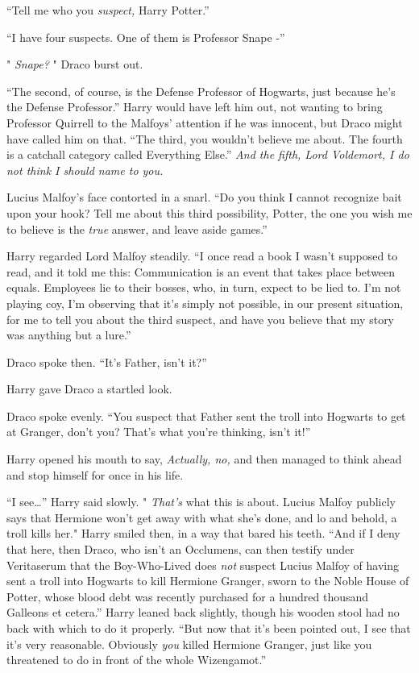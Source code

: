 ``Tell me who you \emph{suspect,} Harry Potter.''

``I have four suspects. One of them is Professor Snape -''

" \emph{Snape?} " Draco burst out.

``The second, of course, is the Defense Professor of Hogwarts, just
because he's the Defense Professor.'' Harry would have left him out, not
wanting to bring Professor Quirrell to the Malfoys' attention if he was
innocent, but Draco might have called him on that. ``The third, you
wouldn't believe me about. The fourth is a catchall category called
Everything Else.'' \emph{And the fifth, Lord Voldemort, I do not think I
should name to you.}

Lucius Malfoy's face contorted in a snarl. ``Do you think I cannot
recognize bait upon your hook? Tell me about this third possibility,
Potter, the one you wish me to believe is the \emph{true} answer, and
leave aside games.''

Harry regarded Lord Malfoy steadily. ``I once read a book I wasn't
supposed to read, and it told me this: Communication is an event that
takes place between equals. Employees lie to their bosses, who, in turn,
expect to be lied to. I'm not playing coy, I'm observing that it's
simply not possible, in our present situation, for me to tell you about
the third suspect, and have you believe that my story was anything but a
lure.''

Draco spoke then. ``It's Father, isn't it?''

Harry gave Draco a startled look.

Draco spoke evenly. ``You suspect that Father sent the troll into
Hogwarts to get at Granger, don't you? That's what you're thinking,
isn't it!''

Harry opened his mouth to say, \emph{Actually, no,} and then managed to
think ahead and stop himself for once in his life.

``I see\ldots{}'' Harry said slowly. " \emph{That's} what this is about.
Lucius Malfoy publicly says that Hermione won't get away with what she's
done, and lo and behold, a troll kills her." Harry smiled then, in a way
that bared his teeth. ``And if I deny that here, then Draco, who isn't
an Occlumens, can then testify under Veritaserum that the Boy-Who-Lived
does \emph{not} suspect Lucius Malfoy of having sent a troll into
Hogwarts to kill Hermione Granger, sworn to the Noble House of Potter,
whose blood debt was recently purchased for a hundred thousand Galleons
et cetera.'' Harry leaned back slightly, though his wooden stool had no
back with which to do it properly. ``But now that it's been pointed out,
I see that it's very reasonable. Obviously \emph{you} killed Hermione
Granger, just like you threatened to do in front of the whole
Wizengamot.''


